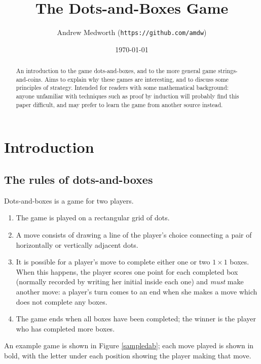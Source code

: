 \documentclass[a4paper,twocolumn]{article}
\begin{document}
\title{The Dots-and-Boxes Game}
\author{Andrew Medworth (\texttt{https://github.com/amdw})}
\date{\today}
\maketitle

\begin{abstract}
  An introduction to the game dots-and-boxes, and to the more general
  game strings-and-coins. Aims to explain why these games are
  interesting, and to discuss some principles of strategy. Intended
  for readers with some mathematical background: anyone unfamiliar
  with techniques such as proof by induction will probably find this
  paper difficult, and may prefer to learn the game from another
  source instead.
\end{abstract}

\tableofcontents

\section{Introduction}

\subsection{The rules of dots-and-boxes}

Dots-and-boxes is a game for two players.

\begin{enumerate}
  \item The game is played on a rectangular grid of dots.
  \item A move consists of drawing a line of the player's choice
    connecting a pair of horizontally or vertically adjacent dots.
  \item It is possible for a player's move to complete either one or
    two $1 \times 1$ boxes. When this happens, the player scores one
    point for each completed box (normally recorded by writing her
    initial inside each one) and \emph{must} make another move: a
    player's turn comes to an end when she makes a move which does not
    complete any boxes.
  \item The game ends when all boxes have been completed; the winner
    is the player who has completed more boxes.
\end{enumerate}

An example game is shown in Figure \ref{sampledab}; each move played
is shown in bold, with the letter under each position showing the
player making that move.
\end{document}
